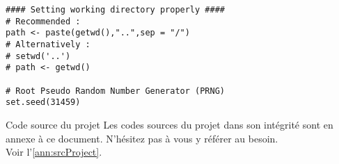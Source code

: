 \begin{lstlisting}[caption = Environnement de travail,label=src:wdSetting]
#### Setting working directory properly ####
# Recommended :
path <- paste(getwd(),"..",sep = "/")
# Alternatively :
# setwd('..')
# path <- getwd()

# Root Pseudo Random Number Generator (PRNG)
set.seed(31459)
\end{lstlisting} 

\begin{moreInfo}{Code source du projet}
	Les codes sources du projet dans son intégrité sont en annexe à ce document. N'hésitez pas à vous y référer au besoin.\\
	Voir l'\autoref{ann:srcProject}.
\end{moreInfo}